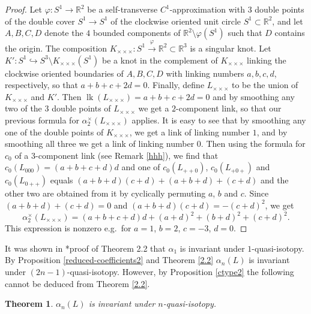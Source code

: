 \documentclass[a4paper,12pt,reqno,oneside]{amsart} %
\theoremstyle{plain}
\newtheorem{theorem}{Theorem}[section]
\theoremstyle{definition}
\theoremstyle{named}
\def\x{\times}
\def\but{\setminus}
\def\emb{\hookrightarrow}
\def\phi{\varphi}
\renewcommand{\:}{\colon}
\def\R{\mathbb{R}}
\def\xr#1{\xrightarrow{#1}}
\DeclareMathOperator{\lk}{lk}
\begin{document}
\begin{proof}
Let $\phi\:S^1\to\R^2$ be a self-transverse $C^1$-approximation with $3$ double points of the double cover 
$S^1\to S^1$ of the clockwise oriented unit circle $S^1\subset\R^2$, and let $A,B,C,D$ denote the $4$ bounded components of 
$\R^2\but\phi(S^1)$ such that $D$ contains the origin.
The composition $K_{\x\x\x}\:S^1\xr{\phi}\R^2\subset\R^3$ is a singular knot.
Let $K'\:S^1\emb S^3\but K_{\x\x\x}(S^1)$ be a knot in the complement of $K_{\x\x\x}$ linking the clockwise oriented 
boundaries of $A,B,C,D$ with linking numbers $a,b,c,d$, respectively, so that $a+b+c+2d=0$.
Finally, define $L_{\x\x\x}$ to be the union of $K_{\x\x\x}$ and $K'$.
Then $\lk(L_{\x\x\x})=a+b+c+2d=0$ and by smoothing any two of the $3$ double points of $L_{\x\x\x}$ 
we get a $2$-component link, so that our previous formula for $\alpha_2^\x(L_{\x\x\x})$ applies.
It is easy to see that by smoothing any one of the double points of $K_{\x\x\x}$, we get a link of linking number $1$,
and by smoothing all three we get a link of linking number $0$.
Then using the formula for $c_0$ of a $3$-component link (see Remark \ref{hhh}), we find that
$c_0(L_{000})=(a+b+c+d)d$ and one of $c_0(L_{++0})$, $c_0(L_{+0+})$ and $c_0(L_{0++})$ equals 
$(a+b+d)(c+d)+(a+b+d)+(c+d)$ and the other two are obtained from it by cyclically permuting $a$, $b$ and $c$.
Since $(a+b+d)+(c+d)=0$ and $(a+b+d)(c+d)=-(c+d)^2$, we get
\[\alpha_2^\x(L_{\x\x\x})=(a+b+c+d)d+(a+d)^2+(b+d)^2+(c+d)^2.\]
This expression is nonzero e.g.\ for $a=1$, $b=2$, $c=-3$, $d=0$. 
\end{proof}

It was shown in \cite{MR1}*{proof of Theorem 2.2} that $\alpha_1$ is invariant under $1$-quasi-isotopy.
By Proposition \ref{reduced-coefficients2} and Theorem \ref{2.2} $\alpha_n(L)$ is invariant under
$(2n-1)$-quasi-isotopy.
However, by Proposition \ref{ctype2} the following cannot be deduced from Theorem \ref{2.2}.

\begin{theorem} \label{conway-quasi} $\alpha_n(L)$ is invariant under $n$-quasi-isotopy.
\end{theorem}
\end{document}
